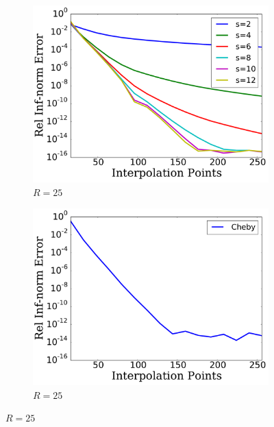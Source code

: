 
\begin{figure}[p]
    \centering
    \begin{subfigure}{0.45\textwidth}
    \includegraphics[width=\textwidth]{plots/msn_1d_birkhoff_smooth_R_25.pdf}
    \caption{$R=25$}
    \end{subfigure}
    \begin{subfigure}{0.45\textwidth}
    \includegraphics[width=\textwidth]{plots/cheby_1d_birkhoff_smooth_R_25.pdf}
    \caption{$R=25$}
    \end{subfigure}


\end{figure}
